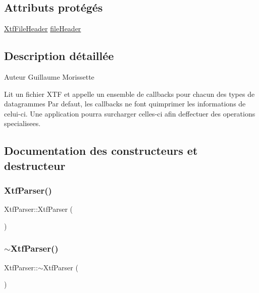\subsection*{Attributs protégés}
\begin{DoxyCompactItemize}
\item 
\hyperlink{structXtfFileHeader}{Xtf\+File\+Header} \hyperlink{classXtfParser_a6ae47b7023578a93dfecbf3035fd9918}{file\+Header}
\end{DoxyCompactItemize}


\subsection{Description détaillée}
\begin{DoxyAuthor}{Auteur}
Guillaume Morissette
\end{DoxyAuthor}
Lit un fichier X\+TF et appelle un ensemble de callbacks pour chacun des types de datagrammes Par defaut, les callbacks ne font qu\textquotesingle{}imprimer les informations de celui-\/ci. Une application pourra surcharger celles-\/ci afin d\textquotesingle{}effectuer des operations specialisees. 

\subsection{Documentation des constructeurs et destructeur}
\mbox{\label{classXtfParser_a7de4082b13254ad7db07a6b2d5ec1580}} 
\subsubsection{\texorpdfstring{Xtf\+Parser()}{XtfParser()}}
{\footnotesize\ttfamily Xtf\+Parser\+::\+Xtf\+Parser (\begin{DoxyParamCaption}{ }\end{DoxyParamCaption})}

\mbox{\label{classXtfParser_a97fd350f03421815e5371142da30d440}} 
\subsubsection{\texorpdfstring{$\sim$\+Xtf\+Parser()}{~XtfParser()}}
{\footnotesize\ttfamily Xtf\+Parser\+::$\sim$\+Xtf\+Parser (\begin{DoxyParamCaption}{ }\end{DoxyParamCaption})}



